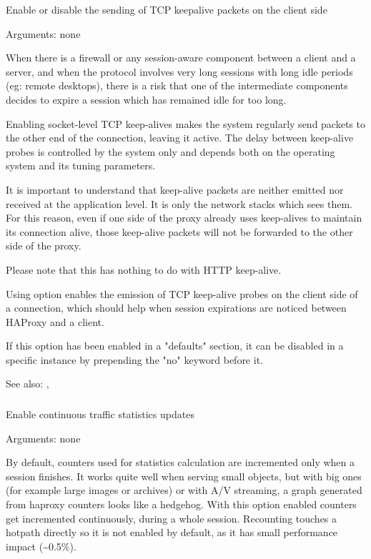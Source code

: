   Enable or disable the sending of TCP keepalive packets on the client side

                                 
  Arguments: none

  When there is a firewall or any session-aware component between a client and
  a server, and when the protocol involves very long sessions with long idle
  periods (eg: remote desktops), there is a risk that one of the intermediate
  components decides to expire a session which has remained idle for too long.

  Enabling socket-level TCP keep-alives makes the system regularly send packets
  to the other end of the connection, leaving it active. The delay between
  keep-alive probes is controlled by the system only and depends both on the
  operating system and its tuning parameters.

  It is important to understand that keep-alive packets are neither emitted nor
  received at the application level. It is only the network stacks which sees
  them. For this reason, even if one side of the proxy already uses keep-alives
  to maintain its connection alive, those keep-alive packets will not be
  forwarded to the other side of the proxy.

  Please note that this has nothing to do with HTTP keep-alive.

  Using option  enables the emission of TCP keep-alive probes on the
  client side of a connection, which should help when session expirations are
  noticed between HAProxy and a client.

  If this option has been enabled in a "defaults" section, it can be disabled
  in a specific instance by prepending the "no" keyword before it.


See also: , 

\subsubsection[contstats]{}

  Enable continuous traffic statistics updates


  Arguments: none

  By default, counters used for statistics calculation are incremented
  only when a session finishes. It works quite well when serving small
  objects, but with big ones (for example large images or archives) or
  with A/V streaming, a graph generated from haproxy counters looks like
  a hedgehog. With this option enabled counters get incremented continuously,
  during a whole session. Recounting touches a hotpath directly so
  it is not enabled by default, as it has small performance impact (\~{}0.5\%).

